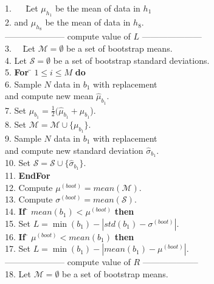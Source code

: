 \documentclass[a4paper,fleqn]{cas-dc}
\begin{document}
\begin{tabbing}
1. ~~ \= Let $\mu_{h_{1}}$ be the mean of data in $h_{1}$ \\
2.   \> and $\mu_{h_{8}}$ be the mean of data in $h_{8}$. \\
--------------------- compute value of $L$ ---------------------\\

3.~~   \= Let $\mathcal{M} = \emptyset$ be a set of bootstrap means. \\
4.   \> Let $\mathcal{S} = \emptyset$ be a set of bootstrap standard deviations. \\
5.   \> {\bf For} \= $1 \leq i \leq M$ {\bf do} \\
6.   \>           \> Sample $N$ data in $b_{1}$ with replacement \\
     \>           \> and compute new mean $\hat{\mu}_{b_{1}}$. \\
7.   \>           \> Set $\mu_{b_{1}} = \frac{1}{2}(\hat{\mu}_{b_{1}} + \mu_{b_{1}}$). \\
8.   \>           \> Set $\mathcal{M} = \mathcal{M} \cup \{\mu_{b_{1}}\}$. \\
9.   \>           \> Sample $N$ data in $b_{1}$ with replacement \\
     \>           \> and compute new standard deviation $\hat{\sigma}_{b_{1}}$. \\
10.  \>           \> Set $\mathcal{S} = \mathcal{S} \cup \{\hat{\sigma}_{b_{1}}\}$. \\
11.  \> {\bf EndFor} \\
12.  \> Compute $\mu^{(boot)} = mean(\mathcal{M})$. \\
13.  \> Compute $\sigma^{(boot)} = mean(\mathcal{S})$. \\
14.  \> {\bf If} \= $mean(b_{1}) < \mu^{(boot)}$ {\bf then} \\
15.  \>          \> Set $L = \min(b_{1}) - |std(b_{1}) - \sigma^{(boot)}|$. \\
16.  \> {\bf If} \= $\mu^{(boot)} < mean(b_{1})$ {\bf then} \\
17.  \>          \> Set $L = \min(b_{1}) - |mean(b_{1}) - \mu^{(boot)}|$. \\
--------------------- compute value of $R$ -------------------- \\
18.  \> Let $\mathcal{M} = \emptyset$ be a set of bootstrap means. \\

\end{tabbing}
\end{document}
